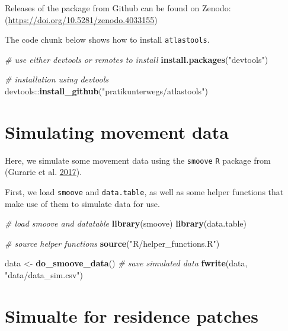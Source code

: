 \documentclass[
]{scrreprt}
\newenvironment{Shaded}{}{}
\newcommand{\CommentTok}[1]{\textcolor[rgb]{0.38,0.63,0.69}{\textit{#1}}}
\newcommand{\KeywordTok}[1]{\textcolor[rgb]{0.00,0.44,0.13}{\textbf{#1}}}
\newcommand{\NormalTok}[1]{#1}
\newcommand{\OperatorTok}[1]{\textcolor[rgb]{0.40,0.40,0.40}{#1}}
\newcommand{\StringTok}[1]{\textcolor[rgb]{0.25,0.44,0.63}{#1}}
\begin{document}
Releases of the package from Github can be found on Zenodo: (\url{https://doi.org/10.5281/zenodo.4033155})

The code chunk below shows how to install \texttt{atlastools}.

\begin{Shaded}
\begin{Highlighting}[]
\CommentTok{\# use either devtools or remotes to install}
\KeywordTok{install.packages}\NormalTok{(}\StringTok{"devtools"}\NormalTok{)}

\CommentTok{\# installation using devtools}
\NormalTok{devtools}\OperatorTok{::}\KeywordTok{install\_github}\NormalTok{(}\StringTok{"pratikunterwegs/atlastools"}\NormalTok{)}
\end{Highlighting}
\end{Shaded}

\hypertarget{simulating-movement-data}{%
\section{Simulating movement data}\label{simulating-movement-data}}

Here, we simulate some movement data using the \texttt{smoove} \texttt{R} package from (Gurarie et al. \protect\hyperlink{ref-gurarie2017}{2017}).

First, we load \texttt{smoove} and \texttt{data.table}, as well as some helper functions that make use of them to simulate data for use.

\begin{Shaded}
\begin{Highlighting}[]
\CommentTok{\# load smoove and datatable}
\KeywordTok{library}\NormalTok{(smoove)}
\KeywordTok{library}\NormalTok{(data.table)}

\CommentTok{\# source helper functions}
\KeywordTok{source}\NormalTok{(}\StringTok{"R/helper\_functions.R"}\NormalTok{)}
\end{Highlighting}
\end{Shaded}

\begin{Shaded}
\begin{Highlighting}[]
\NormalTok{data <{-}}\StringTok{ }\KeywordTok{do\_smoove\_data}\NormalTok{()}
\CommentTok{\# save simulated data}
\KeywordTok{fwrite}\NormalTok{(data, }\StringTok{"data/data\_sim.csv"}\NormalTok{)}
\end{Highlighting}
\end{Shaded}

\hypertarget{simualte-for-residence-patches}{%
\section{Simualte for residence patches}\label{simualte-for-residence-patches}}
\end{document}
